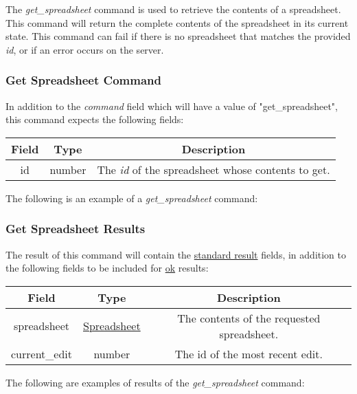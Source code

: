 The \emph{get\_spreadsheet} command is used to retrieve the contents of a 
spreadsheet. This command will return the complete contents of the 
spreadsheet in its current state. This command can fail if there is no 
spreadsheet that matches the provided \emph{id}, or if an error occurs on the 
server.

\subsubsection{Get Spreadsheet Command}
In addition to the \emph{command} field which will have a value of "get\_spreadsheet", this command expects the following fields:
\begin{table}[H]
    \begin{center}
        \begin{tabular}{|c|c|c|}\hline
            Field & Type & Description \\\hline
            id & number & The \emph{id} of the spreadsheet whose contents to get. \\\hline
        \end{tabular}
    \end{center}
\end{table}

The following is an example of a \emph{get\_spreadsheet} command:


\subsubsection{Get Spreadsheet Results}
The result of this command will contain the \hyperref[sec:message:result]{standard result} fields, in addition to the following fields to be included for \underline{ok} results:
\begin{table}[H]
    \begin{center}
        \begin{tabular}{|c|c|c|}\hline
            Field & Type & Description \\\hline
            spreadsheet & \hyperref[sec:message:spreadsheet]{Spreadsheet} & The contents of the requested spreadsheet. \\\hline
            current\_edit & number & The id of the most recent edit. \\\hline
        \end{tabular}
    \end{center}
\end{table}

The following are examples of results of the \emph{get\_spreadsheet} command:



